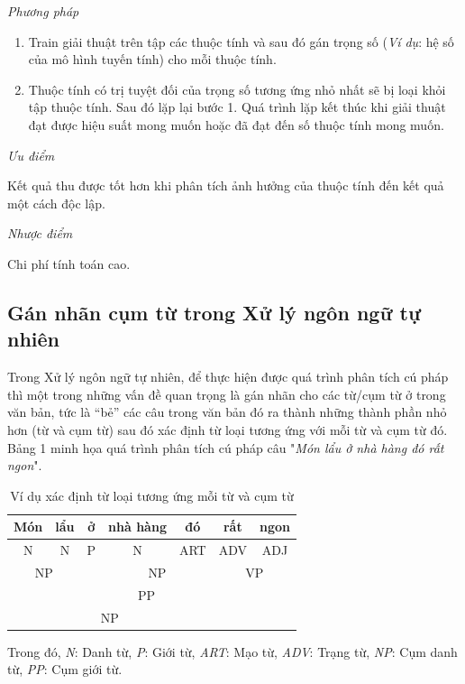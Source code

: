 \documentclass[12pt]{extarticle}
\begin{document}
				\par \textit{Phương pháp}
				\begin{enumerate}
					\item Train giải thuật trên tập các thuộc tính và sau đó gán trọng số (\textit{Ví dụ}: hệ số của mô hình tuyến tính) cho mỗi thuộc tính.
					\item Thuộc tính có trị tuyệt đối của trọng số tương ứng nhỏ nhất sẽ bị loại khỏi tập thuộc tính. Sau đó lặp lại bước 1. Quá trình lặp kết thúc khi giải thuật đạt được hiệu suất mong muốn hoặc đã đạt đến số thuộc tính mong muốn.

				\end{enumerate}
				\par  \textit{Ưu điểm}
				\par Kết quả thu được tốt hơn khi phân tích ảnh hưởng của thuộc tính đến kết quả một cách độc lập.
				\par  \textit{Nhược điểm}
				\par Chi phí tính toán cao.		
		\subsection{Gán nhãn cụm từ trong Xử lý ngôn ngữ tự nhiên}
			\par Trong Xử lý ngôn ngữ tự nhiên, để thực hiện được quá trình phân tích cú pháp thì một trong những vấn đề quan trọng là gán nhãn cho các từ/cụm từ ở trong văn bản, tức là “bẻ” các câu trong văn bản đó ra thành những thành phần nhỏ hơn (từ và cụm từ) sau đó xác định từ loại tương ứng với mỗi từ và cụm từ đó. Bảng 1 minh họa quá trình phân tích cú pháp câu "\textit{Món lẩu ở nhà hàng đó rất ngon}".
			\begin{table}[h]
				\centering
				\caption{Ví dụ xác định từ loại tương ứng mỗi từ và cụm từ}
				\label{my-label}
				\begin{tabular}{|c|c|c|c|c|c|c|}
				\hline
           				Món &   lẩu        &  ở &  nhà hàng          &  đó          &       rất     & ngon           \\ \hline
          					N & N          & P  &    N       &       ART    &     ADV      &     ADJ      \\ \hline
				\multicolumn{2}{|c|}{NP} &  & \multicolumn{2}{c|}{NP} &  \multicolumn{2}{c|}{VP} \\ \hline
				\multicolumn{2}{|c|}{} & \multicolumn{3}{c|}{PP}    &           &           \\ \hline
				\multicolumn{5}{|c|}{NP}                          &           &           \\ \hline
				\end{tabular}
			\end{table}
			\par Trong đó, \textit{N}: Danh từ,  \textit{P}: Giới từ,  \textit{ART}: Mạo từ,  \textit{ADV}: Trạng từ,  \textit{NP}: Cụm danh từ,  \textit{PP}: Cụm giới từ.
\end{document}
